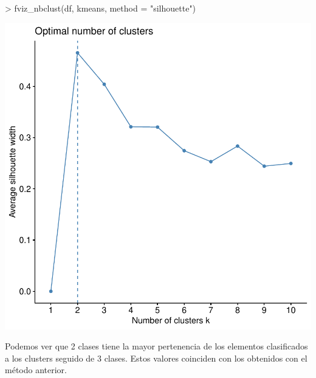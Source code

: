 \documentclass [a4paper] {article}
\begin{document}
\begin{center}
\begin{Schunk}
\begin{Sinput}
> fviz_nbclust(df, kmeans, method = "silhouette")
\end{Sinput}
\end{Schunk}
\includegraphics{entrega-optimal_number_of_clusters_4}
\end{center}

Podemos ver que 2 clases tiene la mayor pertenencia de los elementos clasificados a los clusters seguido de 3 clases.
Estos valores coinciden con los obtenidos con el método anterior.
\end{document}
